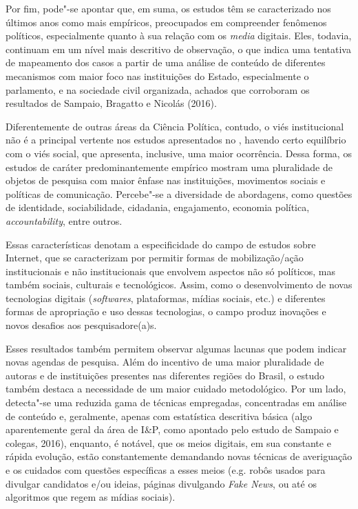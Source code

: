 Por fim, pode"-se apontar que, em suma, os estudos têm se caracterizado
nos últimos anos como mais empíricos, preocupados em compreender
fenômenos políticos, especialmente quanto à sua relação com os
\emph{media} digitais. Eles, todavia, continuam em um nível mais
descritivo de observação, o que indica uma tentativa de mapeamento dos
casos a partir de uma análise de conteúdo de diferentes mecanismos com
maior foco nas instituições do Estado, especialmente o parlamento, e na
sociedade civil organizada, achados que corroboram os resultados de
Sampaio, Bragatto e Nicolás (2016).

Diferentemente de outras áreas da Ciência Política, contudo, o viés
institucional não é a principal vertente nos estudos apresentados no ,
havendo certo equilíbrio com o viés social, que apresenta, inclusive,
uma maior ocorrência. Dessa forma, os estudos de caráter
predominantemente empírico mostram uma pluralidade de objetos de
pesquisa com maior ênfase nas instituições, movimentos sociais e
políticas de comunicação. Percebe"-se a diversidade de abordagens, como
questões de identidade, sociabilidade, cidadania, engajamento, economia
política, \emph{accountability}, entre outros.

Essas características denotam a especificidade do campo de estudos sobre
Internet, que se caracterizam por permitir formas de mobilização/ação
institucionais e não institucionais que envolvem aspectos não só
políticos, mas também sociais, culturais e tecnológicos. Assim, como o
desenvolvimento de novas tecnologias digitais (\emph{softwares},
plataformas, mídias sociais, etc.) e diferentes formas de apropriação e
uso dessas tecnologias, o campo produz inovações e novos desafios aos
pesquisadore(a)s.

Esses resultados também permitem observar algumas lacunas que podem
indicar novas agendas de pesquisa. Além do incentivo de uma maior
pluralidade de autoras e de instituições presentes nas diferentes
regiões do Brasil, o estudo também destaca a necessidade de um maior
cuidado metodológico. Por um lado, detecta"-se uma reduzida gama de
técnicas empregadas, concentradas em análise de conteúdo e, geralmente,
apenas com estatística descritiva básica (algo aparentemente geral da
área de I\&P, como apontado pelo estudo de Sampaio e colegas, 2016),
enquanto, é notável, que os meios digitais, em sua constante e rápida
evolução, estão constantemente demandando novas técnicas de averiguação
e os cuidados com questões específicas a esses meios (e.g. robôs usados
para divulgar candidatos e/ou ideias, páginas divulgando \emph{Fake
News}, ou até os algoritmos que regem as mídias sociais).

